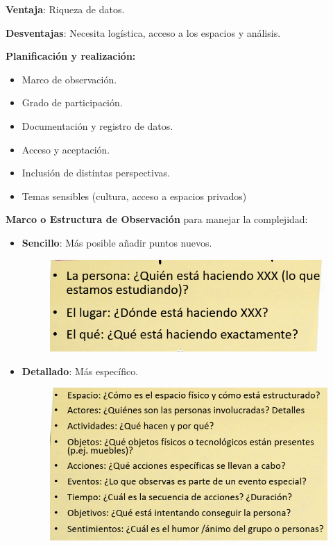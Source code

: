 \documentclass[12pt]{report} %
\begin{document}
\textbf{Ventaja}: Riqueza de datos.

\textbf{Desventajas}: Necesita logística, acceso a los espacios y
análisis.

\textbf{Planificación y realización:}

\begin{itemize}
  \item Marco de observación.
  \item Grado de participación.
  \item Documentación y registro de datos.
  \item Acceso y aceptación.
  \item Inclusión de distintas perspectivas.
  \item Temas sensibles (cultura, acceso a espacios privados)
\end{itemize}

\textbf{Marco o Estructura de Observación} para manejar la complejidad:
\begin{itemize}
  \item \textbf{Sencillo}: Más posible añadir puntos nuevos.
  \begin{figure}[H]
    {\includegraphics[scale=.3]{Untitled 1.png}}
  \end{figure}
  \item \textbf{Detallado}: Más específico.
  \begin{figure}[H]
    {\includegraphics[scale=.25]{Untitled 2.png}}
  \end{figure}
\end{itemize}
\end{document}
